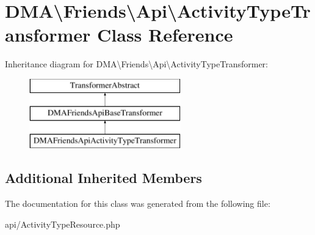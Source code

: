 \hypertarget{classDMA_1_1Friends_1_1Api_1_1ActivityTypeTransformer}{\section{D\-M\-A\textbackslash{}Friends\textbackslash{}Api\textbackslash{}Activity\-Type\-Transformer Class Reference}
\label{classDMA_1_1Friends_1_1Api_1_1ActivityTypeTransformer}
}
Inheritance diagram for D\-M\-A\textbackslash{}Friends\textbackslash{}Api\textbackslash{}Activity\-Type\-Transformer\-:\begin{figure}[H]
\begin{center}
\leavevmode
\includegraphics[height=3.000000cm]{d2/dfa/classDMA_1_1Friends_1_1Api_1_1ActivityTypeTransformer}
\end{center}
\end{figure}
\subsection*{Additional Inherited Members}


The documentation for this class was generated from the following file\-:\begin{DoxyCompactItemize}
\item 
api/Activity\-Type\-Resource.\-php\end{DoxyCompactItemize}
